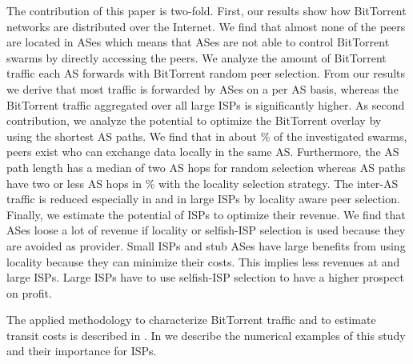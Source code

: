 The contribution of this paper is two-fold.
First, our results show how BitTorrent networks are distributed over the Internet. We find that almost none of the peers are located in \tier ASes which means that \tier ASes are not able to control BitTorrent swarms by directly accessing the peers. We analyze the amount of BitTorrent traffic each AS forwards with BitTorrent random peer selection. From our results we derive that most traffic is forwarded by \tier ASes on a per AS basis, whereas the BitTorrent traffic aggregated over all large ISPs is significantly higher. As second contribution, we analyze the potential to optimize the BitTorrent overlay by using the shortest AS paths. We find that in about \unit[15]{\%} of the investigated swarms, peers exist who can exchange data locally in the same AS. 
Furthermore, the AS path length has a median of two AS hops for random selection whereas AS paths have two or less AS hops in \unit[80]{\%} with the locality selection strategy. The inter-AS traffic is reduced especially in \tier and in large ISPs by locality aware peer selection. Finally, we estimate the potential of ISPs to optimize their revenue. We find that \tier ASes loose a lot of revenue if locality or selfish-ISP selection is used because they are avoided as provider. Small ISPs and stub ASes have large benefits from using locality because they can minimize their costs. This implies less revenues at \tier and large ISPs. Large ISPs have to use selfish-ISP selection to have a higher prospect on profit.

The applied methodology to characterize BitTorrent traffic and to estimate transit costs is described in . In  we describe the numerical examples of this study and their importance for ISPs.



